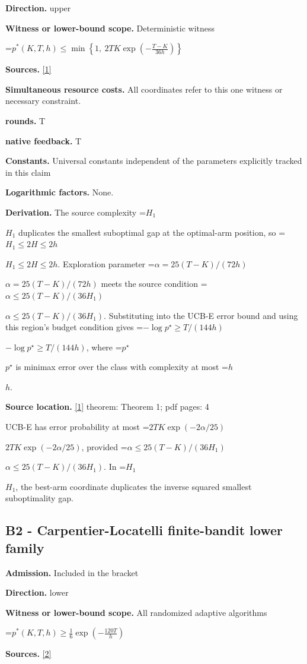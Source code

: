 \documentclass[10pt,a4paper]{article}
\newcommand{\AtlasMath}[1]{\par\begingroup\centering\setbox0=\hbox{$\displaystyle #1$}\ifdim\wd0>1.4\linewidth\typeout{ATLAS WIDE FORMULA: \the\wd0}\fi\ifdim\wd0>\linewidth\resizebox{\linewidth}{!}{\box0}\else\box0\fi\par\endgroup}
\newcommand{\AtlasInlineMath}[1]{\begingroup\setbox0=\hbox{$#1$}\ifdim\wd0>.4\linewidth\endgroup\AtlasMath{#1}\else\endgroup$#1$\fi}
\begin{document}
\textbf{Direction.} upper

\textbf{Witness or lower-bound scope.} Deterministic witness

\AtlasMath{p^*(K,T,h)\le\min\left\{1,\ 2TK\exp\left(-\frac{T-K}{36h}\right)\right\}}
\textbf{Sources.} \href{https://www.learningtheory.org/colt2010/papers/59Audibert.pdf}{[1]}

\textbf{Simultaneous resource costs.} All coordinates refer to this one witness or necessary constraint.

\textbf{rounds.} T

\textbf{native feedback.} T

\textbf{Constants.} Universal constants independent of the parameters explicitly tracked in this claim

\textbf{Logarithmic factors.} None.

\textbf{Derivation.} The source complexity \AtlasInlineMath{H_1} duplicates the smallest suboptimal gap at the optimal-arm position, so \AtlasInlineMath{H_1\le2H\le2h}. Exploration parameter \AtlasInlineMath{\alpha=25(T-K)/(72h)} meets the source condition \AtlasInlineMath{\alpha\le25(T-K)/(36H_1)}. Substituting into the UCB-E error bound and using this region's budget condition gives \AtlasInlineMath{-\log p^\star\ge T/(144h)}, where \AtlasInlineMath{p^\star} is minimax error over the class with complexity at most \AtlasInlineMath{h}.

\textbf{Source location.} \href{https://www.learningtheory.org/colt2010/papers/59Audibert.pdf}{[1]} theorem: Theorem 1; pdf pages: 4

UCB-E has error probability at most \AtlasInlineMath{2TK\exp(-2\alpha/25)}, provided \AtlasInlineMath{\alpha\le25(T-K)/(36H_1)}. In \AtlasInlineMath{H_1}, the best-arm coordinate duplicates the inverse squared smallest suboptimality gap.

\subsection{B2 - Carpentier-Locatelli finite-bandit lower family}
\textbf{Admission.} Included in the bracket

\textbf{Direction.} lower

\textbf{Witness or lower-bound scope.} All randomized adaptive algorithms

\AtlasMath{p^*(K,T,h)\ge\frac16\exp\left(-\frac{120T}{h}\right)}
\textbf{Sources.} \href{https://proceedings.mlr.press/v49/carpentier16.pdf}{[2]}
\end{document}
